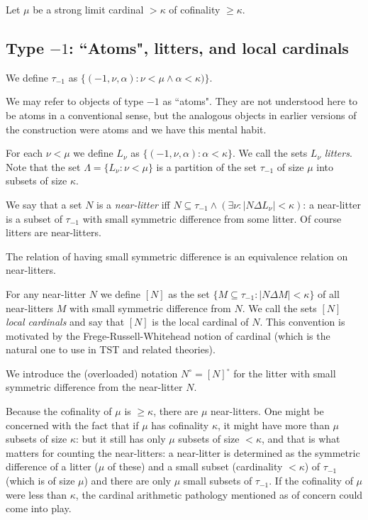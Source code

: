 \documentclass[112pt]{article}
\begin{document}
Let $\mu$ be a strong limit cardinal $>\kappa$ of cofinality $\geq \kappa$.  



\subsection{Type $-1$:  ``Atoms", litters, and local cardinals}

We define $\tau_{-1}$ as $\{(-1,\nu,\alpha):\nu <\mu \wedge \alpha<\kappa)\}$.

We may refer to objects of type $-1$ as ``atoms".  They are not understood here to be atoms in a conventional sense, but the analogous objects in earlier versions of the construction were atoms and we have this mental habit.

For each $\nu<\mu$ we define $L_\nu$ as $\{(-1,\nu,\alpha):\alpha<\kappa\}$.  We call the sets $L_\nu$ {\em litters\/}.
Note that the set $\Lambda = \{L_\nu:\nu < \mu\}$ is a partition of the set $\tau_{-1}$ of size $\mu$ into subsets of size $\kappa$.

We say that a set $N$ is a {\em near-litter\/} iff $N \subseteq \tau_{-1} \wedge (\exists \nu:|N \Delta L_\nu|<\kappa)$:  a near-litter is a subset of $\tau_{-1}$ with small symmetric difference from some litter.  Of course litters are near-litters.

The relation of having small symmetric difference is an equivalence relation on near-litters.

For any near-litter $N$ we define $[N]$ as the set $\{M\subseteq \tau_{-1}:|N \Delta M| <\kappa\}$  of all near-litters $M$ with small symmetric difference from $N$.  We call the sets $[N]$ {\em local cardinals\/} and say that $[N]$ is the local cardinal of $N$.  This convention is motivated by the Frege-Russell-Whitehead notion of cardinal (which is the natural one to use in TST and related theories).

We introduce the (overloaded) notation $N^\circ = [N]^\circ$ for the litter with small symmetric difference from the near-litter $N$.

Because the cofinality of $\mu$ is $\geq \kappa$, there are $\mu$ near-litters.   One might be concerned with the fact that if $\mu$ has cofinality $\kappa$, it might have more than $\mu$ subsets of size $\kappa$:  but it still has only $\mu$ subsets of size $<\kappa$, and that is what matters for counting the near-litters:  a near-litter is determined as the symmetric difference of a litter ($\mu$ of these) and a small subset (cardinality $<\kappa$) of $\tau_{-1}$ (which is of size $\mu$) and there are only $\mu$ small subsets of $\tau_{-1}$.  If the cofinality of $\mu$ were less than $\kappa$, the cardinal arithmetic pathology mentioned as of concern could come into play.
\end{document}
